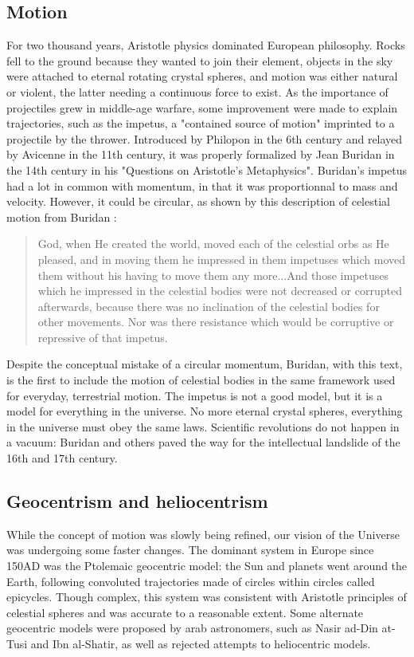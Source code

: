 \subsection*{Motion}
For two thousand years, Aristotle physics dominated European philosophy. Rocks fell to the ground because they wanted to join their element, objects in the sky were attached to eternal rotating crystal spheres, and motion was either natural or violent, the latter needing a continuous force to exist. As the importance of projectiles grew in middle-age warfare, some improvement were made to explain trajectories, such as the impetus, a "contained source of motion" imprinted to a projectile by the thrower. Introduced by Philopon in the 6th century and relayed by Avicenne in the 11th century, it was properly formalized by Jean Buridan in the 14th century in his "Questions on Aristotle's Metaphysics". Buridan's impetus had a lot in common with momentum, in that it was proportionnal to mass and velocity. However, it could be circular, as shown by this description of celestial motion from Buridan \citep{Clagett1959}:

\begin{quote}
God, when He created the world, moved each of the celestial orbs as He pleased, and in moving them he impressed in them impetuses which moved them without his having to move them any more...And those impetuses which he impressed in the celestial bodies were not decreased or corrupted afterwards, because there was no inclination of the celestial bodies for other movements. Nor was there resistance which would be corruptive or repressive of that impetus.
\end{quote} 




Despite the conceptual mistake of a circular momentum, Buridan, with this text, is the first to include the motion of celestial bodies in the same framework used for everyday, terrestrial motion. The impetus is not a good model, but it is a model for everything in the universe. No more eternal crystal spheres, everything in the universe must obey the same laws. Scientific revolutions do not happen in a vacuum: Buridan and others paved the way for the intellectual landslide of the 16th and 17th century.

\subsection*{Geocentrism and heliocentrism}

While the concept of motion was slowly being refined, our vision of the Universe was undergoing some faster changes. The dominant system in Europe since 150AD was the Ptolemaic geocentric model: the Sun and planets went around the Earth, following convoluted trajectories made of circles within circles called epicycles. Though complex, this system was consistent with Aristotle principles of celestial spheres and was accurate to a reasonable extent. Some alternate geocentric models were proposed by arab astronomers, such as Nasir ad-Din at-Tusi and Ibn al-Shatir, as well as rejected attempts to heliocentric models.

